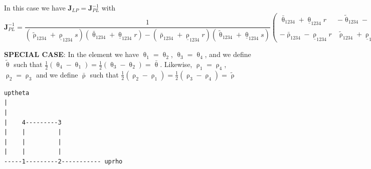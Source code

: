 In this case we have ${\bm J}_{LP}={\bm J}_{PL}^{-1}$ with
\begin{equation}
{\bm J}_{PL}^{-1}= \frac{1}{ 
(\tilde{\uprho}_{1234} + \underline{\uprho}_{1234} s )
(\bar{\uptheta}_{1234} + \underline{\uptheta}_{1234}r )
- 
(\bar{\uprho}_{1234} + \underline{\uprho}_{1234} r )
(\tilde{\uptheta}_{1234} + \underline{\uptheta}_{1234}s )
} 
\left(
\begin{array}{cc}
\bar{\uptheta}_{1234} + \underline{\uptheta}_{1234}r
& -\tilde{\uptheta}_{1234} - \underline{\uptheta}_{1234}s \\ \\
-\bar{\uprho}_{1234} - \underline{\uprho}_{1234} r  
&\tilde{\uprho}_{1234} + \underline{\uprho}_{1234} s 
\end{array}
\right)
\end{equation}


{\bf SPECIAL CASE}: In the element we have 
$\uptheta_1=\uptheta_2$, $\uptheta_3=\uptheta_4$,
and we define $\tilde{\uptheta}$ such that 
$\frac12(\uptheta_4-\uptheta_1)=\frac12(\uptheta_3-\uptheta_2)=\bar{\uptheta}$.
Likewise,
$\uprho_1=\uprho_4$, $\uprho_2=\uprho_3$ and
we define $\bar{\uprho}$ such that $\frac12(\uprho_2-\uprho_1)=\frac12(\uprho_3-\uprho_4)=\tilde{\uprho}$

\begin{verbatim}
uptheta
|
|
|    4---------3
|    |         |
|    |         |
|    |         |
-----1---------2----------- uprho
\end{verbatim}


